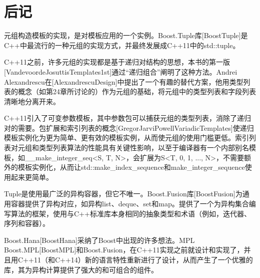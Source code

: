 \section{后记}

元组构造模板的实现，是对模板应用的一个实例。Boost.Tuple库[BoostTuple]是C++中最流行的一种元组的实现方式，并最终发展成C++11中的std::tuple。

C++11之前，许多元组的实现都是基于递归对结构的思想，本书的第一版[VandevoordeJosuttisTemplates1st]通过“递归组合”阐明了这种方法。Andrei Alexandrescu在[AlexandrescuDesign]中提出了一个有趣的替代方案，他用类型列表的概念（如第24章所讨论的）作为元组的基础，将元组中的类型列表和字段列表清晰地分离开来。

C++11引入了可变参数模板，其中参数包可以捕获元组的类型列表，消除了递归对的需要。包扩展和索引列表的概念[GregorJarviPowellVariadicTemplates]使递归模板实例化为更为简单、更有效的模板实例，从而使元组的使用门槛更低。索引列表对元组和类型列表算法的性能具有关键性影响，以至于编译器有一个内部别名模板，如\_\_make\_integer\_seq<S, T, N>，会扩展为S<T, 0, 1, ..., N>，不需要额外的模板实例化，从而让std::make\_index\_sequence和make\_integer\_sequence使用起来更简单。

Tuple是使用最广泛的异构容器，但它不唯一。Boost.Fusion库[BoostFusion]为通用容器提供了异构对应，如异构list、deque、set和map。提供了一个为异构集合编写算法的框架，使用与C++标准库本身相同的抽象类型和术语（例如，迭代器、序列和容器）。

Boost.Hana[BoostHana]采纳了Boost中出现的许多想法。MPL Boost.MPL[BoostMPL]和Boost.Fusion，在C++11实现之前就设计和实现了，并且用C++11（和C++14）新的语言特性重新进行了设计，从而产生了一个优雅的库，其为异构计算提供了强大的和可组合的组件。